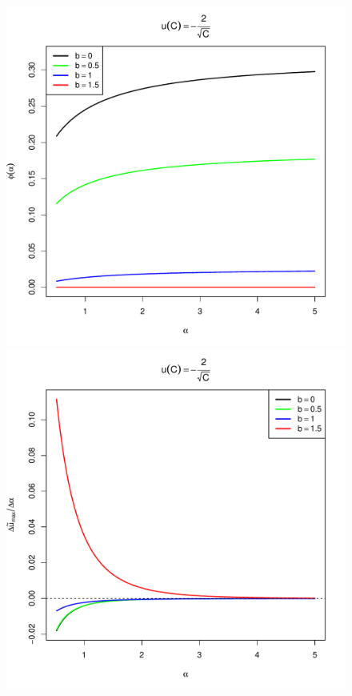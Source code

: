 \begin{subappendices}
\begin{figure}[htb!]
  \begin{minipage}{0.5\linewidth}
    \includegraphics[width=\textwidth]{phi_hat_b_t_power.pdf}
  \end{minipage}\hfill
  \begin{minipage}{0.5\linewidth}
    \includegraphics[width=\textwidth]{U_b_t_power.pdf}

\end{minipage}
\end{figure}
\end{subappendices}
